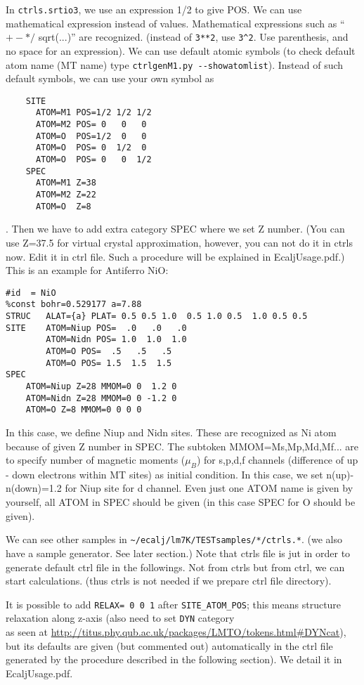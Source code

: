 \documentclass[a4paper,10pt,epsf,fleqn]{article}
\begin{document}
In \verb+ctrls.srtio3+, we use an expression 1/2 to give POS. 
We can use mathematical expression instead of values.
Mathematical expressions such as ``$+ -  * /$ sqrt(...)'' are recognized.
(instead of \verb+3**2+, use \verb+3^2+. Use parenthesis, and
 no space for an expression).
We can use default atomic symbols (to check default atom name
(MT name) type \verb+ctrlgenM1.py --showatomlist+).
Instead of such default symbols, we can use your own symbol as
\begin{verbatim}
    SITE
      ATOM=M1 POS=1/2 1/2 1/2
      ATOM=M2 POS= 0   0   0
      ATOM=O  POS=1/2  0   0
      ATOM=O  POS= 0  1/2  0
      ATOM=O  POS= 0   0  1/2
    SPEC
      ATOM=M1 Z=38
      ATOM=M2 Z=22
      ATOM=O  Z=8
\end{verbatim}
. Then we have to add extra category SPEC where we set Z number.
(You can use Z=37.5 for virtual crystal approximation, however, 
you can not do it in ctrls now. Edit it in ctrl file. Such a procedure
will be explained in EcaljUsage.pdf.)\\

This is an example for Antiferro NiO:
\begin{verbatim}
#id  = NiO
%const bohr=0.529177 a=7.88
STRUC   ALAT={a} PLAT= 0.5 0.5 1.0  0.5 1.0 0.5  1.0 0.5 0.5
SITE    ATOM=Niup POS=  .0   .0   .0
        ATOM=Nidn POS= 1.0  1.0  1.0
        ATOM=O POS=  .5   .5   .5
        ATOM=O POS= 1.5  1.5  1.5
SPEC
    ATOM=Niup Z=28 MMOM=0 0  1.2 0
    ATOM=Nidn Z=28 MMOM=0 0 -1.2 0
    ATOM=O Z=8 MMOM=0 0 0 0
\end{verbatim}
In this case, we define Niup and Nidn sites. These are recognized as
Ni atom because of given Z number in SPEC. The subtoken MMOM=Ms,Mp,Md,Mf...
are to specify number of magnetic moments ($\mu_B$) for s,p,d,f channels (difference of up -
down electrons within MT sites) as initial condition. In this case, we set n(up)-n(down)=1.2
for Niup site for d channel. Even just one ATOM name is given
by yourself, all ATOM in SPEC should be given (in this case SPEC for O should be given).

We can see other samples in \verb+~/ecalj/lm7K/TESTsamples/*/ctrls.*+.
(we also have a sample generator. See later section.)
Note that ctrls file is jut in order to generate default ctrl file in
the followings. Not from ctrls but from ctrl, we can start calculations.
(thus ctrls is not needed if we prepare ctrl file directory).

It is possible to add \verb+RELAX= 0 0 1+ after \verb+SITE_ATOM_POS+;
this means structure relaxation along z-axis 
(also need to set \verb+DYN+ category \\
 as seen at \url{http://titus.phy.qub.ac.uk/packages/LMTO/tokens.html#DYNcat}),
but its defaults are given (but commented out) automatically in the ctrl file
generated by the procedure described in the following section).
We detail it in EcaljUsage.pdf.
\end{document}
